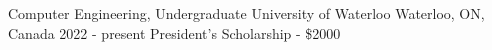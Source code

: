 

\begin{cventries}

  \cventry
    {Computer Engineering, Undergraduate} %
    {University of Waterloo} %
    {Waterloo, ON, Canada} %
    {2022 - present} %
    {President's Scholarship - \$2000}

\end{cventries}
